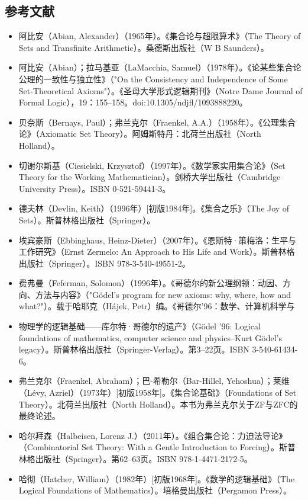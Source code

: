 \subsection{参考文献}
\begin{itemize}
\item 阿比安（Abian, Alexander）（1965年）。《集合论与超限算术》（The Theory of Sets and Transfinite Arithmetic）。桑德斯出版社（W B Saunders）。
\item 阿比安（Abian）；拉马基亚（LaMacchia, Samuel）（1978年）。《论某些集合论公理的一致性与独立性》（"On the Consistency and Independence of Some Set-Theoretical Axioms"）。《圣母大学形式逻辑期刊》（Notre Dame Journal of Formal Logic），19：155–158。doi:10.1305/ndjfl/1093888220。
\item 贝奈斯（Bernays, Paul）；弗兰克尔（Fraenkel, A.A.）（1958年）。《公理集合论》（Axiomatic Set Theory）。阿姆斯特丹：北荷兰出版社（North Holland）。
\item 切谢尔斯基（Ciesielski, Krzysztof）（1997年）。《数学家实用集合论》（Set Theory for the Working Mathematician）。剑桥大学出版社（Cambridge University Press）。ISBN 0-521-59441-3。
\item 德夫林（Devlin, Keith）（1996年）[初版1984年]。《集合之乐》（The Joy of Sets）。斯普林格出版社（Springer）。
\item 埃宾豪斯（Ebbinghaus, Heinz-Dieter）（2007年）。《恩斯特·策梅洛：生平与工作研究》（Ernst Zermelo: An Approach to His Life and Work）。斯普林格出版社（Springer）。ISBN 978-3-540-49551-2。
\item 费弗曼（Feferman, Solomon）（1996年）。《哥德尔的新公理纲领：动因、方向、方法与内容》（"Gödel's program for new axioms: why, where, how and what?"）。载于哈耶克（Hájek, Petr）编。《哥德尔’96：数学、计算机科学与\item 物理学的逻辑基础——库尔特·哥德尔的遗产》（Gödel '96: Logical foundations of mathematics, computer science and physics–Kurt Gödel's legacy）。斯普林格出版社（Springer-Verlag）。第3–22页。ISBN 3-540-61434-6。
\item 弗兰克尔（Fraenkel, Abraham）；巴-希勒尔（Bar-Hillel, Yehoshua）；莱维（Lévy, Azriel）（1973年）[初版1958年]。《集合论基础》（Foundations of Set Theory）。北荷兰出版社（North Holland）。本书为弗兰克尔关于ZF与ZFC的最终论述。
\item 哈尔拜森（Halbeisen, Lorenz J.）（2011年）。《组合集合论：力迫法导论》（Combinatorial Set Theory: With a Gentle Introduction to Forcing）。斯普林格出版社（Springer）。第62–63页。ISBN 978-1-4471-2172-5。
\item 哈彻（Hatcher, William）（1982年）[初版1968年]。《数学的逻辑基础》（The Logical Foundations of Mathematics）。培格曼出版社（Pergamon Press）。

\end{itemize}
